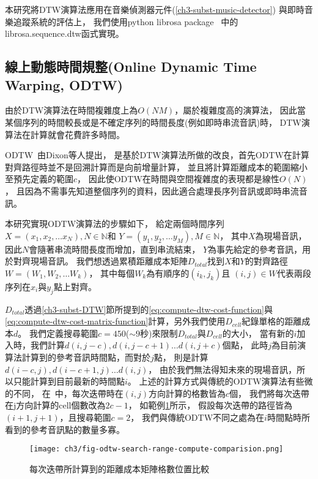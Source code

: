 \documentclass[class=NCU_thesis, crop=false]{standalone}
\begin{document}
本研究將DTW演算法應用在音樂偵測器元件(\cref{ch3-subst-music-detector})
與即時音樂追蹤系統的評估上，
我們使用python librosa package~\cite{McFee2024librosa}
中的librosa.sequence.dtw函式實現。

\subsection{線上動態時間規整(Online Dynamic Time Warping, ODTW)} \label{ch3-subst-ODTW}
由於DTW演算法在時間複雜度上為$O(NM)$，屬於複雜度高的演算法，
因此當某個序列的時間較長或是不確定序列的時間長度(例如即時串流音訊)時，
DTW演算法在計算就會花費許多時間。

ODTW~\cite{dixon2005ODTW}由Dixon等人提出，
是基於DTW演算法所做的改良，首先ODTW在計算對齊路徑時並不是回溯計算而是向前增量計算，
並且將計算距離成本的範圍縮小至預先定義的範圍$c$，
因此使ODTW在時間與空間複雜度的表現都是線性$O(N)$，
且因為不需事先知道整個序列的資料，因此適合處理長序列音訊或即時串流音訊。

本研究實現ODTW演算法的步驟如下，
給定兩個時間序列
$X = (x_1, x_2, \dots x_N), N \in \mathbb{N}$和
$Y = (y_1, y_2, \dots y_M), M \in \mathbb{N}$，
其中$X$為現場音訊，因此$N$會隨著串流時間長度而增加，直到串流結束，
$Y$為事先給定的參考音訊，用於對齊現場音訊。
我們想透過累積距離成本矩陣$D_{total}$找到$X$和$Y$的對齊路徑$W = (W_1, W_2, \dots W_k)$，
其中每個$W_k$為有順序的$(i_k,j_k)$且
$(i,j) \in W$代表兩段序列在$x_i$與$y_j$點上對齊。

$D_{total}$透過\ref{ch3-subst-DTW}節所提到的\cref{eq:compute-dtw-cost-function}與
\cref{eq:compute-dtw-cost-matrix-function}計算，另外我們使用$D_{cell}$紀錄單格的距離成本$d$。
我們定義搜尋範圍$c=450$($\sim 9$秒)來限制$D_{total}$與$D_{cell}$的大小，
當有新的$i$加入時，我們計算$d(i, j-c), d(i, j-c+1) \dots d(i, j+c)$個點，
此時$j$為目前演算法計算到的參考音訊時間點，而對於$j$點，
則是計算$d(i-c, j), d(i-c+1, j) \dots d(i, j)$，
由於我們無法得知未來的現場音訊，所以只能計算到目前最新的時間點$i$。
上述的計算方式與傳統的ODTW演算法有些微的不同，
在~\cite{dixon2005ODTW}中，每次迭帶時在$(i, j)$方向計算的格數皆為$c$個，
我們將每次迭帶在j方向計算的cell個數改為$2c-1$，
如範例\cref{fig:fig-ch3-odtw-search-range-compute-comparision}所示，
假設每次迭帶的路徑皆為$(i+1, j+1)$，且搜尋範圍$c=2$，
我們與傳統ODTW不同之處為在$i$時間點時所看到的參考音訊點的數量多寡。
\begin{figure}[H]
    \centering
    \texttt{[image: ch3/fig-odtw-search-range-compute-comparision.png]}
    \caption{每次迭帶所計算到的距離成本矩陣格數位置比較}
    \label{fig:fig-ch3-odtw-search-range-compute-comparision}
\end{figure}
\end{document}
